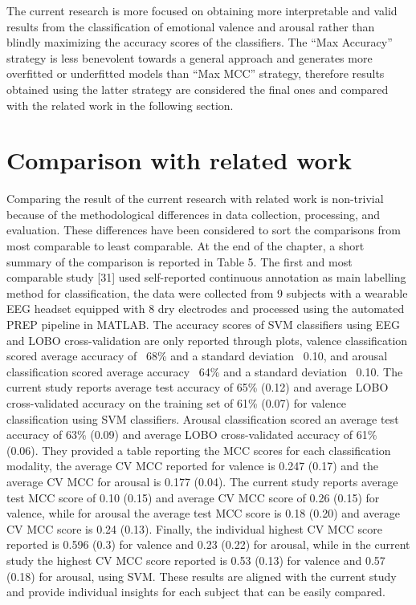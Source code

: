 The current research is more focused on obtaining more interpretable and valid results from the classification of emotional valence and arousal rather than blindly maximizing the accuracy scores of the classifiers. The “Max Accuracy” strategy is less benevolent towards a general approach and generates more overfitted or underfitted models than “Max MCC” strategy, therefore results obtained using the latter strategy are considered the final ones and compared with the related work in the following section.

\section{Comparison with related work}
Comparing the result of the current research with related work is non-trivial because of the methodological differences in data collection, processing, and evaluation. These differences have been considered to sort the comparisons from most comparable to least comparable. At the end of the chapter, a short summary of the comparison is reported in Table 5. 
The first and most comparable study [31] used self-reported continuous annotation as main labelling method for classification, the data were collected from 9 subjects with a wearable EEG headset equipped with 8 dry electrodes and processed using the automated PREP pipeline in MATLAB. The accuracy scores of SVM classifiers using EEG and LOBO cross-validation are only reported through plots, valence classification scored average accuracy of ~68\% and a standard deviation ~0.10, and arousal classification scored average accuracy ~64\% and a standard deviation ~0.10. The current study reports average test accuracy of 65\% (0.12) and average LOBO cross-validated accuracy on the training set of 61\% (0.07) for valence classification using SVM classifiers. Arousal classification scored an average test accuracy of 63\% (0.09) and average LOBO cross-validated accuracy of 61\% (0.06). They provided a table reporting the MCC scores for each classification modality, the average CV MCC reported for valence is 0.247 (0.17) and the average CV MCC for arousal is 0.177 (0.04). The current study reports average test MCC score of 0.10 (0.15) and average CV MCC score of 0.26 (0.15) for valence, while for arousal the average test MCC score is 0.18 (0.20) and average CV MCC score is 0.24 (0.13). Finally, the individual highest CV MCC score reported is 0.596 (0.3) for valence and 0.23 (0.22) for arousal, while in the current study the highest CV MCC score reported is 0.53 (0.13) for valence and 0.57 (0.18) for arousal, using SVM. These results are aligned with the current study and provide individual insights for each subject that can be easily compared.
